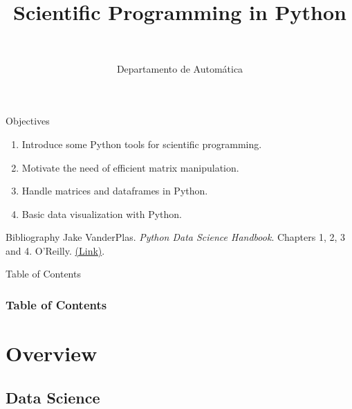 \documentclass[10pt,compress]{beamer} %
\title[Scientific Programming]{Scientific Programming in Python}
\author{\asignatura\\\carrera}
\institute{}
\date{Departamento de Automática}
\begin{document}
{\titlepageBlue
    \begin{frame}
        \titlepage
    \end{frame}
}

\begin{frame}[plain]{}
	\begin{block}{Objectives}
		\begin{enumerate}
		\item Introduce some Python tools for scientific programming.
		\item Motivate the need of efficient matrix manipulation.
		\item Handle matrices and dataframes in Python.
		\item Basic data visualization with Python.
		\end{enumerate}
	\end{block}

   \begin{block}{Bibliography}
       Jake VanderPlas. \textit{Python Data Science Handbook}. Chapters 1, 2, 3 and 4. O'Reilly. \href{https://jakevdp.github.io/PythonDataScienceHandbook/}{(Link)}.
   \end{block}

\end{frame}

{
\begin{frame}[shrink]{Table of Contents}
 \frametitle{Table of Contents}
 \tableofcontents
\end{frame}
}

\section{Overview}

\subsection{Data Science}
\end{document}
